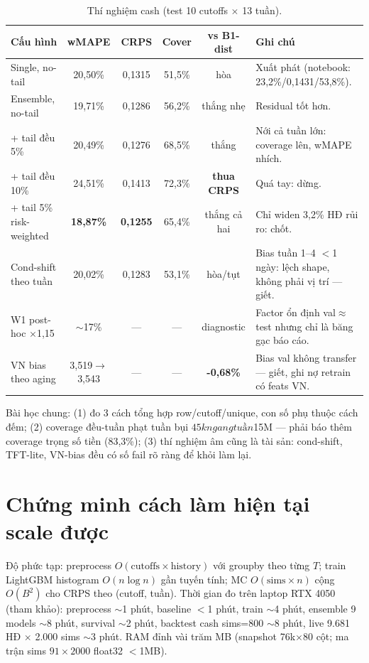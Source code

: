 \documentclass[12pt,a4paper]{article}
\begin{document}
\begin{table}[h]\centering
\caption{Thí nghiệm cash (test 10 cutoffs $\times$ 13 tuần).}
\label{tab:cashexp}
\begin{tabular}{lccccp{4cm}}\toprule
Cấu hình & wMAPE & CRPS & Cover & vs B1-dist & Ghi chú \\\midrule
Single, no-tail & 20,50\% & 0,1315 & 51,5\% & hòa & Xuất phát (notebook: 23,2\%/0,1431/53,8\%). \\
Ensemble, no-tail & 19,71\% & 0,1286 & 56,2\% & thắng nhẹ & Residual tốt hơn. \\
+ tail đều 5\% & 20,49\% & 0,1276 & 68,5\% & thắng & Nới cả tuần lớn: coverage lên, wMAPE nhích. \\
+ tail đều 10\% & 24,51\% & 0,1413 & 72,3\% & \textbf{thua CRPS} & Quá tay: dừng. \\
+ tail 5\% risk-weighted & \textbf{18,87\%} & \textbf{0,1255} & 65,4\% &
thắng cả hai & Chỉ widen 3,2\% HĐ rủi ro: chốt. \\
Cond-shift theo tuần & 20,02\% & 0,1283 & 53,1\% & hòa/tụt &
Bias tuần 1--4 $<$1 ngày: lệch shape, không phải vị trí --- giết. \\
W1 post-hoc $\times$1,15 & $\sim$17\% & --- & --- & diagnostic &
Factor ổn định val$\approx$test nhưng chỉ là băng gạc báo cáo. \\
VN bias theo aging & 3,519$\to$3,543 & --- & --- & \textbf{-0,68\%} &
Bias val không transfer --- giết, ghi nợ retrain có feats VN. \\\bottomrule
\end{tabular}
\end{table}

Bài học chung: (1) đo 3 cách tổng hợp row/cutoff/unique, con số phụ thuộc cách đếm;
(2) coverage đều-tuần phạt tuần bụi $45k ngang tuần $15M --- phải báo thêm coverage trọng số tiền (83,3\%);
(3) thí nghiệm âm cũng là tài sản: cond-shift, TFT-lite, VN-bias đều có số fail rõ ràng để khỏi làm lại.

\section{Chứng minh cách làm hiện tại scale được}
\label{sec:scale}

Độ phức tạp: preprocess $O(\text{cutoffs}\times \text{history})$ với groupby theo từng $T$;
train LightGBM histogram $O(n \log n)$ gần tuyến tính; MC $O(\text{sims}\times n)$ cộng
$O(B^2)$ cho CRPS theo (cutoff, tuần). Thời gian đo trên laptop RTX 4050 (tham khảo):
preprocess $\sim$1 phút, baseline $<$1 phút, train $\sim$4 phút, ensemble 9 models $\sim$8 phút,
survival $\sim$2 phút, backtest cash sims=800 $\sim$8 phút, live 9.681 HĐ $\times$ 2.000 sims $\sim$3 phút.
RAM đỉnh vài trăm MB (snapshot 76k$\times$80 cột; ma trận sims $91\times2000$ float32 $<$1MB).
\end{document}
